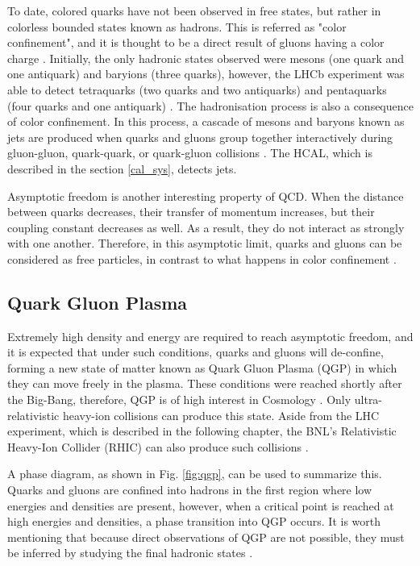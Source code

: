 To date, colored quarks have not been observed in free states, but rather in colorless bounded states known as hadrons. This is referred as "color confinement", and it is thought to be a direct result of gluons having a color charge \cite{di2020measurement, thomson2013modern}. Initially, the only hadronic states observed were mesons (one quark and one antiquark) and baryions (three quarks), however, the LHCb experiment was able to detect tetraquarks (two quarks and two antiquarks) \cite{aaij2021study} and pentaquarks (four quarks and one antiquark) \cite{aaij2015observation}. The hadronisation process is also a consequence of color confinement.  In this process, a cascade of mesons and baryons known as jets are produced when quarks and gluons group together interactively during gluon-gluon, quark-quark, or quark-gluon collisions \cite{di2020measurement, baron2018desarrollo}.  The HCAL, which is described in the section \ref{cal_sys}, detects jets.

Asymptotic freedom is another interesting property of QCD. When the distance between quarks decreases, their transfer of momentum increases, but their coupling constant decreases as well. As a result, they do not interact as strongly with one another. Therefore, in this asymptotic limit, quarks and gluons can be considered as free particles, in contrast to what happens in color confinement \cite{danilov2020measurement, di2020measurement, sanchez2020search}. 

\subsection{Quark Gluon Plasma}
Extremely high density and energy are required to reach asymptotic freedom, and it is expected that under such conditions, quarks and gluons will de-confine, forming a new state of matter known as Quark Gluon Plasma (QGP) in which they can move freely in the plasma. These conditions were reached shortly after the Big-Bang, therefore, QGP is of high interest in Cosmology \cite{aziz2021z}. Only ultra-relativistic heavy-ion collisions can produce this state. Aside from the LHC experiment, which is described in the following chapter, the BNL's Relativistic Heavy-Ion Collider (RHIC) can also produce such collisions \cite{villatorodetection}. 

A phase diagram, as shown in Fig. \ref{fig:qgp}, can be used to summarize this. Quarks and gluons are confined into hadrons in the first region where low energies and densities are present, however, when a critical point is reached at high energies and densities, a phase transition into QGP occurs. It is worth mentioning that because direct observations of QGP are not possible, they must be inferred by studying the final hadronic states \cite{villatorodetection, parkkila2021quantifying}.

